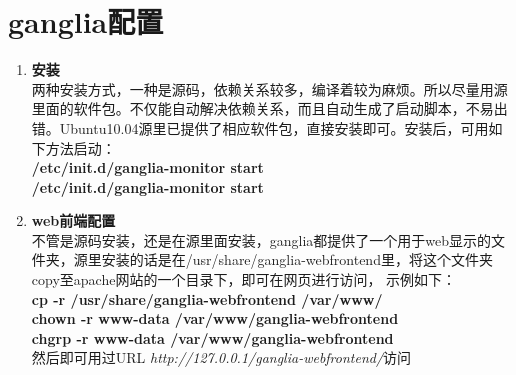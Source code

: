 \documentclass[11pt]{article}
\begin{document}
\section{ganglia配置}
\begin{enumerate}
\item{\textbf{安装}} \\
两种安装方式，一种是源码，依赖关系较多，编译着较为麻烦。所以尽量用源里面的软件包。不仅能自动解决依赖关系，而且自动生成了启动脚本，不易出错。Ubuntu10.04源里已提供了相应软件包，直接安装即可。安装后，可用如下方法启动：\\
\textbf{/etc/init.d/ganglia-monitor start} \\ 
\textbf{/etc/init.d/ganglia-monitor start} \\
\item{\textbf{web前端配置}} \\
不管是源码安装，还是在源里面安装，ganglia都提供了一个用于web显示的文件夹，源里安装的话是在/usr/share/ganglia-webfrontend里，将这个文件夹copy至apache网站的一个目录下，即可在网页进行访问，
示例如下： \\
\textbf{cp -r /usr/share/ganglia-webfrontend /var/www/} \\
\textbf{chown -r www-data /var/www/ganglia-webfrontend } \\
\textbf{ chgrp -r www-data /var/www/ganglia-webfrontend } \\
然后即可用过URL \textit{http://127.0.0.1/ganglia-webfrontend/}访问
\end{enumerate}
\end{document}
